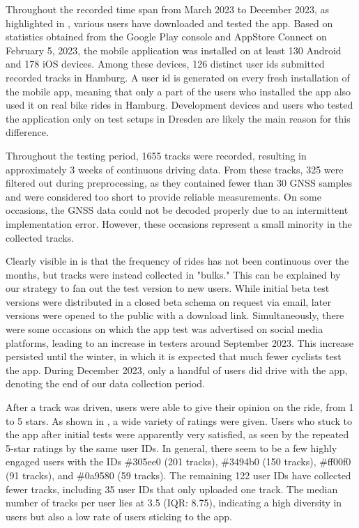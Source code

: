 Throughout the recorded time span from March 2023 to December 2023, as highlighted in , various users have downloaded and tested the app. Based on statistics obtained from the Google Play console and AppStore Connect on February 5, 2023, the mobile application was installed on at least 130 Android and 178 iOS devices. Among these devices, 126 distinct user ids submitted recorded tracks in Hamburg. A user id is generated on every fresh installation of the mobile app, meaning that only a part of the users who installed the app also used it on real bike rides in Hamburg. Development devices and users who tested the application only on test setups in Dresden are likely the main reason for this difference.

Throughout the testing period, 1655 tracks were recorded, resulting in approximately 3 weeks of continuous driving data. From these tracks, 325 were filtered out during preprocessing, as they contained fewer than 30 GNSS samples and were considered too short to provide reliable measurements. On some occasions, the GNSS data could not be decoded properly due to an intermittent implementation error. However, these occasions represent a small minority in the collected tracks.

Clearly visible in  is that the frequency of rides has not been continuous over the months, but tracks were instead collected in "bulks." This can be explained by our strategy to fan out the test version to new users. While initial beta test versions were distributed in a closed beta schema on request via email, later versions were opened to the public with a download link. Simultaneously, there were some occasions on which the app test was advertised on social media platforms, leading to an increase in testers around September 2023. This increase persisted until the winter, in which it is expected that much fewer cyclists test the app. During December 2023, only a handful of users did drive with the app, denoting the end of our data collection period. 

After a track was driven, users were able to give their opinion on the ride, from 1 to 5 stars. As shown in , a wide variety of ratings were given. Users who stuck to the app after initial tests were apparently very satisfied, as seen by the repeated 5-star ratings by the same user IDs. In general, there seem to be a few highly engaged users with the IDs \#305ee0 (201 tracks), \#3494b0 (150 tracks), \#ff00f0 (91 tracks), and \#0a9580 (59 tracks). The remaining 122 user IDs have collected fewer tracks, including 35 user IDs that only uploaded one track. The median number of tracks per user lies at 3.5 (IQR: 8.75), indicating a high diversity in users but also a low rate of users sticking to the app. 


